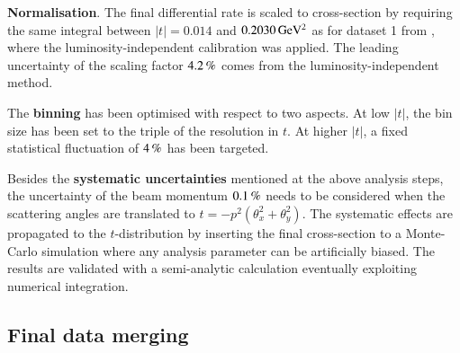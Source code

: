 {\bf Normalisation}. The final differential rate is scaled to cross-section by requiring the same integral between $|t| = 0.014$ and $0.2030\,{\rm GeV^2}$ as for dataset 1 from \cite{prl111}, where the luminosity-independent calibration was applied. The leading uncertainty of the scaling factor $4.2\,{\rm \%}$ comes from the luminosity-independent method.



The {\bf binning} has been optimised with respect to two aspects. At low $|t|$, the bin size has been set to the triple of the resolution in $t$. At higher $|t|$, a fixed statistical fluctuation of $4\,{\rm \%}$ has been targeted.


Besides the {\bf systematic uncertainties} mentioned at the above analysis steps, the uncertainty of the beam momentum $0.1\,{\rm \%}$ needs to be considered when the scattering angles are translated to $t = - p^2 (\theta_x^2 + \theta_y^2)$. The systematic effects are propagated to the $t$-distribution by inserting the final cross-section to a Monte-Carlo simulation where any analysis parameter can be artificially biased. The results are validated with a semi-analytic calculation eventually exploiting numerical integration.

\subsection{Final data merging}

